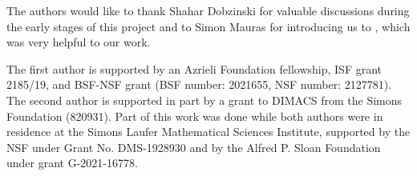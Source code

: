 The authors would like to thank Shahar Dobzinski for valuable discussions during the early stages of this project and to Simon Mauras for introducing us to \cite{reiffenhauser2019optimal}, which was very helpful to our work.

The first author is supported by an Azrieli Foundation fellowship, ISF grant 2185/19, and BSF-NSF grant (BSF number: 2021655, NSF number: 2127781).
The second author is supported in part by a grant to DIMACS from the Simons Foundation (820931). Part of this work was done while both authors were in residence at
the Simons Laufer Mathematical Sciences Institute, supported by the NSF under Grant No. DMS-1928930
and by the Alfred P. Sloan Foundation under grant G-2021-16778.